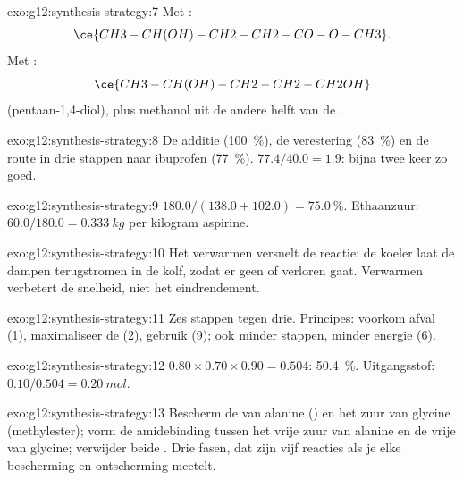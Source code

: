 \begin{solution}{exo:g12:synthesis-strategy:7}
Met :
\[ \ce{CH3-CH(OH)-CH2-CH2-CO-O-CH3} . \]
Met :
\[ \ce{CH3-CH(OH)-CH2-CH2-CH2OH} \]
(pentaan-1,4-diol), plus methanol uit de andere helft van de .
\end{solution}

\begin{solution}{exo:g12:synthesis-strategy:8}
De additie (\qty{100}{\percent}), de verestering
(\qty{83}{\percent}) en de route in drie stappen naar ibuprofen
(\qty{77}{\percent}). $77.4/40.0 = 1.9$: bijna twee keer zo goed.
\end{solution}

\begin{solution}{exo:g12:synthesis-strategy:9}
$180.0/(138.0 + 102.0) = \qty{75.0}{\percent}$. Ethaanzuur:
$60.0/180.0 = \qty{0.333}{kg}$ per kilogram aspirine.
\end{solution}

\begin{solution}{exo:g12:synthesis-strategy:10}
Het verwarmen versnelt de reactie; de koeler laat de dampen terugstromen
in de kolf, zodat er geen  of  verloren gaat.
Verwarmen verbetert de snelheid, niet het eindrendement.
\end{solution}

\begin{solution}{exo:g12:synthesis-strategy:11}
Zes stappen tegen drie. Principes: voorkom afval (1), maximaliseer de
 (2), gebruik  (9); ook minder stappen, minder
energie (6).
\end{solution}

\begin{solution}{exo:g12:synthesis-strategy:12}
$0.80 \times 0.70 \times 0.90 = 0.504$: \qty{50.4}{\percent}.
Uitgangsstof: $0.10/0.504 = \qty{0.20}{mol}$.
\end{solution}

\begin{solution}{exo:g12:synthesis-strategy:13}
Bescherm de  van alanine () en het zuur van glycine
(methylester); vorm de amidebinding tussen het vrije zuur van alanine en
de vrije  van glycine; verwijder beide . Drie
fasen, dat zijn vijf reacties als je elke bescherming en ontscherming
meetelt.
\end{solution}

